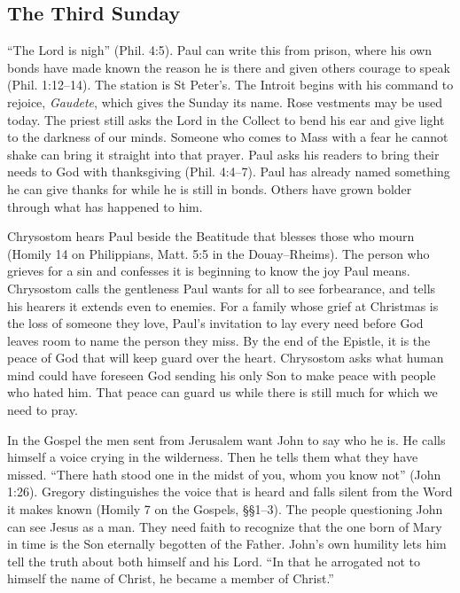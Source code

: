 \subsection{The Third Sunday}

“The Lord is nigh” (Phil. 4:5). Paul can write this from prison, where his
own bonds have made known the reason he is there and given others courage
to speak (Phil. 1:12--14). The station is St Peter's. The Introit begins
with his command to rejoice, \emph{Gaudete}, which gives the Sunday its
name. Rose vestments may be used today. The priest still asks the Lord
in the Collect to bend his ear and give light to the darkness of our
minds. Someone who comes to Mass with a fear he cannot shake can bring
it straight into that prayer. Paul asks his readers to bring
their needs to God with thanksgiving (Phil. 4:4--7). Paul has already named something he can give thanks
for while he is still in bonds. Others have grown bolder through
what has happened to him.

Chrysostom hears Paul beside the Beatitude that blesses those who mourn
(Homily 14 on Philippians, Matt. 5:5 in the Douay--Rheims). The person
who grieves for a sin and confesses it is beginning to know the joy Paul
means. Chrysostom calls the gentleness Paul wants for all to see
forbearance, and tells his hearers it extends even to enemies. For a
family whose grief at Christmas is the loss of someone they love,
Paul's invitation to lay every need before God leaves room to name
the person they miss. By the end
of the Epistle, it is the peace of God that will keep guard over the
heart. Chrysostom asks what human mind could have foreseen God sending his
only Son to make peace with people who hated him. That peace can guard us
while there is still much for which we need to pray.

In the Gospel the men sent from Jerusalem want John to say who he is.
He calls himself a voice crying in the wilderness. Then he tells them
what they have missed. “There hath stood one in the midst of you, whom you
know not” (John 1:26). Gregory distinguishes the voice that is heard and
falls silent from the Word it makes known (Homily 7 on the Gospels,
§§1--3). The people questioning John can see Jesus as a man. They need
faith to recognize that the one born of Mary in time is the Son eternally
begotten of the Father. John's own humility lets him tell the truth about
both himself and his Lord. “In that he arrogated not to himself the name
of Christ, he became a member of Christ.”

